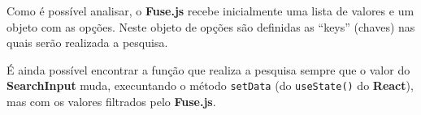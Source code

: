 Como é possível analisar, o \textit{} \textbf{Fuse.js} recebe inicialmente uma lista de valores e um objeto com as opções. Neste objeto de opções são definidas as ``keys'' (chaves) nas quais serão realizada a pesquisa.

É ainda possível encontrar a função que realiza a pesquisa sempre que o valor do \textbf{SearchInput} muda, execuntando o método \texttt{setData} (do \texttt{useState()} do \textbf{React}), mas com os valores filtrados pelo \textbf{Fuse.js}.